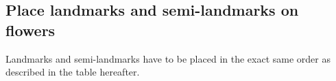 \documentclass[10pt,letter,english]{article}
\begin{document}

\subsection{Place landmarks and semi-landmarks on flowers}


Landmarks and semi-landmarks have to be placed in the exact same order as described in the table hereafter.

\end{document}
